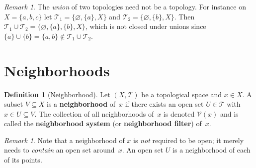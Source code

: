 \documentclass[11pt,a4paper,twoside]{book}
\theoremstyle{remark}
\newtheorem{remark}[theorem]{Remark}
\theoremstyle{definition}
\theoremstyle{definition}
\newtheorem{definition}{Definition}[section]
\newcommand{\Tau}{\mathcal{T}}           %
\newcommand{\Nbhd}{\mathcal{V}}          %
\begin{document}
\begin{remark}\label{rem:union-not-topology}
The \emph{union} of two topologies need not be a topology.  For instance on
$X=\{a,b,c\}$ let $\Tau_1=\{\varnothing,\{a\},X\}$ and
$\Tau_2=\{\varnothing,\{b\},X\}$.  Then
$\Tau_1\cup\Tau_2=\{\varnothing,\{a\},\{b\},X\}$, which is not closed under
unions since $\{a\}\cup\{b\}=\{a,b\}\notin\Tau_1\cup\Tau_2$.
\end{remark}


\section{Neighborhoods}
\label{sec:neighborhoods}

\begin{definition}[Neighborhood]\label{def:neighborhood}
Let $(X,\Tau)$ be a topological space and $x\in X$.  A subset $V\subseteq X$
is a \textbf{neighborhood} of~$x$ if there exists an open set $U\in\Tau$ with
$x\in U\subseteq V$.  The collection of all neighborhoods of~$x$ is denoted
$\Nbhd(x)$ and is called the \textbf{neighborhood system}%
 (or \textbf{neighborhood filter}) of~$x$.
\end{definition}

\begin{remark}
Note that a neighborhood of $x$ is \emph{not} required to be open; it merely
needs to \emph{contain} an open set around~$x$.  An open set $U$ is a
neighborhood of each of its points.
\end{remark}
\end{document}
